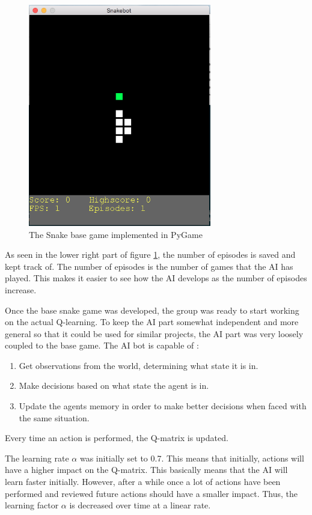 \documentclass[fleqn,10pt]{SelfArx} %
\begin{document}
\begin{figure} 
	\centering
		\includegraphics[width=8cm]{basegame.png}
	\caption{The Snake base game implemented in PyGame}
    \label{fig:snakegame}
\end{figure}

As seen in the lower right part of figure \ref{fig:snakegame}, the number of episodes is saved and kept track of. The number of episodes is the number of games that the AI has played. This makes it easier to see how the AI develops as the number of episodes increase.

Once the base snake game was developed, the group was ready to start working on the actual Q-learning. To keep the AI part somewhat independent and more general so that it could be used for similar projects, the AI part was very loosely coupled to the base game. The AI bot is capable of :
\begin{enumerate}[label=\roman*]
  	\item Get observations from the world, determining what state it is in.
	\item Make decisions based on what state the agent is in.
	\item Update the agents memory in order to make better decisions when faced with the same situation.
\end{enumerate}
Every time an action is performed, the Q-matrix is updated.

The learning rate $\alpha$ was initially set to 0.7. This means that initially, actions will have a higher impact on the Q-matrix. This basically means that the AI will learn faster initially. However, after a while once a lot of actions have been performed and reviewed future actions should have a smaller impact. Thus, the learning factor $\alpha$ is decreased over time at a linear rate.
\end{document}
